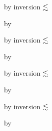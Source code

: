 {\begin{lamportproof*}
    \begin{pfproof}
        \begin{pfproof}
          by inversion $\lesssim$
        \end{pfproof}
      \qedstep
        \begin{pfproof}
          by \pfih
        \end{pfproof}
    \end{pfproof}

    \begin{pfproof}
        \begin{pfproof}
          by inversion $\lesssim$
        \end{pfproof}
      \qedstep
        \begin{pfproof}
          by \pfih
        \end{pfproof}
    \end{pfproof}

    \begin{pfproof}
        \begin{pfproof}
          by inversion $\lesssim$
        \end{pfproof}
      \qedstep
        \begin{pfproof}
          by \pfih
        \end{pfproof}
    \end{pfproof}

    \begin{pfproof}
        \begin{pfproof}
          by inversion $\lesssim$
        \end{pfproof}
      \qedstep
        \begin{pfproof}
          by \pfih
        \end{pfproof}
    \end{pfproof}


\end{lamportproof*}}
